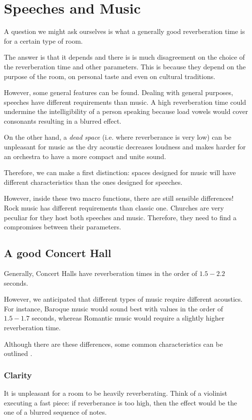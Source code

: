 \documentclass[a4paper]{article}
\begin{document}
\section{Speeches and Music}
A question we might ask ourselves is what a generally good reverberation time is for a certain type of room.

The answer is that it depends and there is is much disagreement on the choice of the reverberation time and other parameters. This is because they depend on the purpose of the room, on personal taste and even on cultural traditions.

However, some general features can be found. Dealing with general purposes, speeches have different requirements than music. A high reverberation time could undermine the intelligibility of a person speaking because load vowels would cover consonants resulting in a blurred effect.

On the other hand, a \textit{dead space} (i.e. where reverberance is very low) can be unpleasant for music \cite{book:acoustic3} as the dry acoustic decreases loudness and makes harder for an orchestra to have a more compact and unite sound. 

Therefore, we can make a first distinction: spaces designed for music will have different characteristics than the ones designed for speeches.

However, inside these two macro functions, there are still sensible differences! Rock music has different requirements than classic one. Churches are very peculiar for they host both speeches and music. Therefore, they need to find a compromises between their parameters.

\subsection{A good Concert Hall}
Generally, Concert Halls have reverberation times in the order of $1.5 - 2.2$ seconds.

However, we anticipated that different types of music require different acoustics. For instance, Baroque music would sound best with values in the order of $1.5-1.7$ seconds, whereas Romantic music would require a slightly higher reverberation time.

Although there are these differences, some common characteristics can be outlined \cite{book:acoustic3}.

\subsubsection*{Clarity}
It is unpleasant for a room to be heavily reverberating. Think of a violinist executing a fast piece: if reverberance is too high, then the effect would be the one of a blurred sequence of notes.
\end{document}
